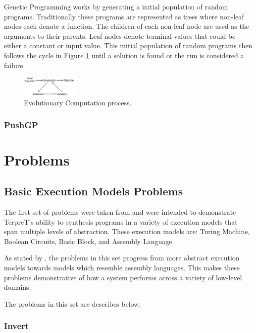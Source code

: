Genetic Programming works by generating a initial population of random programs. Traditionally these programs are represented as trees where non-leaf nodes each denote a function. The children of each non-leaf node are used as the arguments to their parents. Leaf nodes denote terminal values that could be either a constant or input value. This initial population of random programs then follows the cycle in Figure \ref{fig:evo}  until a solution is found or the run is considered a failure.

\begin{figure}[t]
\centering
\includegraphics[width=0.25\textwidth]{res/EvolutionCycle}
\caption{Evolutionary Computation process.}
\label{fig:evo}
\end{figure}

\subsubsection{PushGP}


\section{Problems}
\subsection{Basic Execution Models Problems}
The first set of problems were taken from \cite{Gaunt2016} and were intended to demonstrate TerpreT's ability to synthesis programs in a variety of execution models that span multiple levels of abstraction. These execution models are: Turing Machine, Boolean Circuits, Basic Block, and Assembly Language. 

As stated by \cite{Gaunt2016}, the problems in this set progress from more abstract execution models towards models which resemble assembly languages. This makes these problems demonstrative of how a system performs across a variety of low-level domains. 
 
The problems in this set are describes below:

\subsubsection{Invert}

